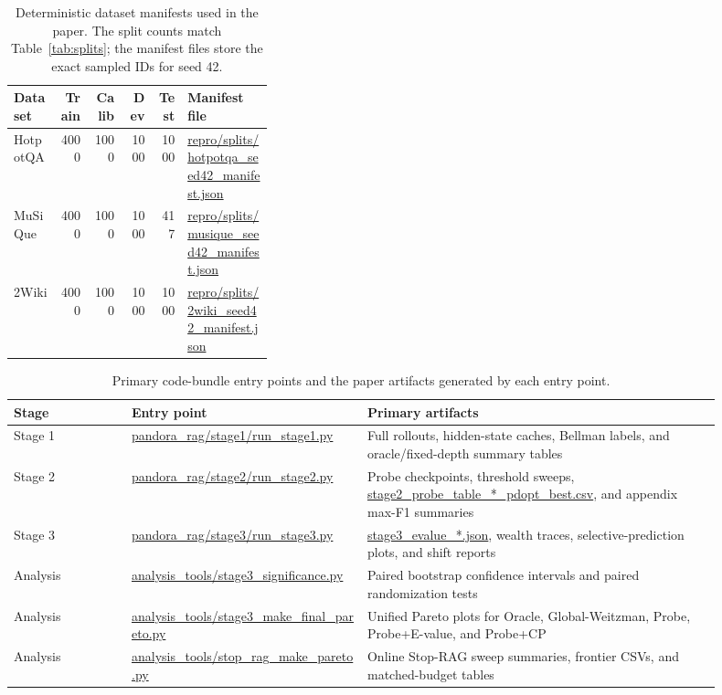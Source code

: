 \documentclass{article}
\newcommand{\hotpot}{HotpotQA}
\newcommand{\musique}{MuSiQue}
\begin{document}
\begin{table}[htbp]
  \caption{Deterministic dataset manifests used in the paper. The split counts match Table~\ref{tab:splits}; the manifest files store the exact sampled IDs for seed 42.}
  \label{tab:appendix-splits}
  \centering
  \small
  \begin{tabular}{lrrrrp{0.33\linewidth}}
    \toprule
    Dataset & Train & Calib & Dev & Test & Manifest file \\
    \midrule
    \hotpot{} & 4000 & 1000 & 1000 & 1000 & \url{repro/splits/hotpotqa_seed42_manifest.json} \\
    \musique{} & 4000 & 1000 & 1000 & 417 & \url{repro/splits/musique_seed42_manifest.json} \\
    2Wiki & 4000 & 1000 & 1000 & 1000 & \url{repro/splits/2wiki_seed42_manifest.json} \\
    \bottomrule
  \end{tabular}
\end{table}

\begin{table}[htbp]
  \caption{Primary code-bundle entry points and the paper artifacts generated by each entry point.}
  \label{tab:appendix-entrypoints}
  \centering
  \small
  \begin{tabular}{p{0.15\linewidth}p{0.30\linewidth}p{0.45\linewidth}}
    \toprule
    Stage & Entry point & Primary artifacts \\
    \midrule
    Stage 1 & \url{pandora_rag/stage1/run_stage1.py} & Full rollouts, hidden-state caches, Bellman labels, and oracle/fixed-depth summary tables \\
    Stage 2 & \url{pandora_rag/stage2/run_stage2.py} & Probe checkpoints, threshold sweeps, \url{stage2_probe_table_*_pdopt_best.csv}, and appendix max-F1 summaries \\
    Stage 3 & \url{pandora_rag/stage3/run_stage3.py} & \url{stage3_evalue_*.json}, wealth traces, selective-prediction plots, and shift reports \\
    Analysis & \url{analysis_tools/stage3_significance.py} & Paired bootstrap confidence intervals and paired randomization tests \\
    Analysis & \url{analysis_tools/stage3_make_final_pareto.py} & Unified Pareto plots for Oracle, Global-Weitzman, Probe, Probe+E-value, and Probe+CP \\
    Analysis & \url{analysis_tools/stop_rag_make_pareto.py} & Online Stop-RAG sweep summaries, frontier CSVs, and matched-budget tables \\
    \bottomrule
  \end{tabular}
\end{table}
\end{document}
